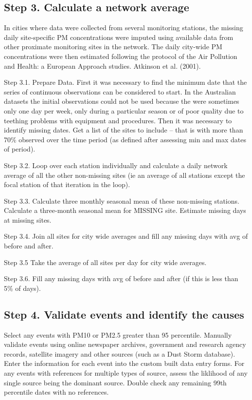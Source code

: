 \subsection{Step 3. Calculate a network
average}\label{step-3.-calculate-a-network-average}

In cities where data were collected from several monitoring stations,
the missing daily site-specific PM concentrations were imputed using
available data from other proximate monitoring sites in the network. The
daily city-wide PM concentrations were then estimated following the
protocol of the Air Pollution and Health: a European Approach studies.
Atkinson et al. (2001).

Step 3.1. Prepare Data. First it was necessary to find the minimum date
that the series of continuous observations can be considered to start.
In the Australian datasets the initial observations could not be used
because the were sometimes only one day per week, only during a
particular season or of poor quality due to teething problems with
equipment and procedures. Then it was necessary to identify missing
dates. Get a list of the sites to include -- that is with more than 70\%
observed over the time period (as defined after assessing min and max
dates of period).

Step 3.2. Loop over each station individually and calculate a daily
network average of all the other non-missing sites (ie an average of all
stations except the focal station of that iteration in the loop).

Step 3.3. Calculate three monthly seasonal mean of these non-missing
stations. Calculate a three-month seasonal mean for MISSING site.
Estimate missing days at missing sites.

Step 3.4. Join all sites for city wide averages and fill any missing
days with avg of before and after.

Step 3.5 Take the average of all sites per day for city wide averages.

Step 3.6. Fill any missing days with avg of before and after (if this is
less than 5\% of days).

\subsection{Step 4. Validate events and identify the
causes}\label{step-4.-validate-events-and-identify-the-causes}

Select any events with PM10 or PM2.5 greater than 95 percentile.
Manually validate events using online newspaper archives, government and
research agency records, satellite imagery and other sources (such as a
Dust Storm database). Enter the information for each event into the
custom built data entry forms. For any events with references for
multiple types of source, assess the liklihood of any single source
being the dominant source. Double check any remaining 99th percentile
dates with no references.

